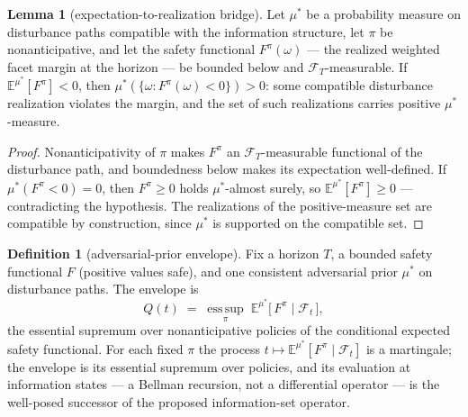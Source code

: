 \documentclass[10pt,twocolumn]{article}
\theoremstyle{definition}
\newtheorem{definition}{Definition}
\newtheorem{lemma}{Lemma}
\begin{document}
\begin{lemma}[expectation-to-realization bridge]\label{lem:bridge}
Let $\mu^{*}$ be a probability measure on disturbance paths compatible with
the information structure, let $\pi$ be nonanticipative, and let the
safety functional $F^{\pi}(\omega)$ --- the realized weighted facet margin
at the horizon --- be bounded below and $\mathcal{F}_{T}$-measurable. If
$\mathbb{E}^{\mu^{*}}[F^{\pi}] < 0$, then
$\mu^{*}(\{\omega: F^{\pi}(\omega) < 0\}) > 0$: some compatible disturbance
realization violates the margin, and the set of such realizations carries
positive $\mu^{*}$-measure.
\end{lemma}
\begin{proof}
Nonanticipativity of $\pi$ makes $F^{\pi}$ an $\mathcal{F}_{T}$-measurable
functional of the disturbance path, and boundedness below makes its
expectation well-defined. If $\mu^{*}(F^{\pi} < 0) = 0$, then
$F^{\pi} \ge 0$ holds $\mu^{*}$-almost surely, so
$\mathbb{E}^{\mu^{*}}[F^{\pi}] \ge 0$ --- contradicting the hypothesis. The
realizations of the positive-measure set are compatible by construction,
since $\mu^{*}$ is supported on the compatible set.
\end{proof}

\begin{definition}[adversarial-prior envelope]\label{def:envelope}
Fix a horizon $T$, a bounded safety functional $F$ (positive values safe),
and one consistent adversarial prior $\mu^{*}$ on disturbance paths. The
envelope is
\[
Q(t) \;=\; \operatorname*{ess\,sup}_{\pi} \;
\mathbb{E}^{\mu^{*}}\bigl[\, F^{\pi} \;\big|\; \mathcal{F}_{t} \,\bigr],
\]
the essential supremum over nonanticipative policies of the conditional
expected safety functional. For each fixed $\pi$ the process
$t \mapsto \mathbb{E}^{\mu^{*}}[F^{\pi} \mid \mathcal{F}_{t}]$ is a
martingale; the envelope is its essential supremum over policies, and its
evaluation at information states --- a Bellman recursion, not a
differential operator --- is the well-posed successor of the proposed
information-set operator.
\end{definition}
\end{document}
